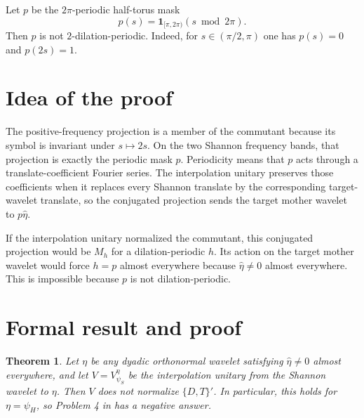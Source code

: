 \documentclass[11pt]{article}
\newtheorem{theorem}{Theorem}
\begin{document}
Let $p$ be the $2\pi$-periodic half-torus mask
\begin{equation}\label{eq:p}
 p(s)=\mathbf1_{[\pi,2\pi)}(s\bmod 2\pi).
\end{equation}
Then $p$ is not $2$-dilation-periodic.  Indeed, for
$s\in(\pi/2,\pi)$ one has $p(s)=0$ and $p(2s)=1$.

\section{Idea of the proof}

The positive-frequency projection is a member of the commutant because its
symbol is invariant under $s\mapsto2s$.  On the two Shannon frequency bands,
that projection is exactly the periodic mask $p$.  Periodicity means that $p$
acts through a translate-coefficient Fourier series.  The interpolation unitary
preserves those coefficients when it replaces every Shannon translate by the
corresponding target-wavelet translate, so the conjugated projection sends the
target mother wavelet to $p\widehat\eta$.

If the interpolation unitary normalized the commutant, this conjugated
projection would be $M_h$ for a dilation-periodic $h$.  Its action on the target
mother wavelet would force $h=p$ almost everywhere because
$\widehat\eta\ne0$ almost everywhere.  This is impossible because $p$ is not
dilation-periodic.

\section{Formal result and proof}

\begin{theorem}\label{thm:main}
Let $\eta$ be any dyadic orthonormal wavelet satisfying
$\widehat\eta\ne0$ almost everywhere, and let $V=V_{\psi_S}^{\eta}$ be the
interpolation unitary from the Shannon wavelet to $\eta$.  Then $V$ does not
normalize $\{D,T\}'$.  In particular, this holds for $\eta=\psi_H$, so Problem
4 in \cite{Larson2006} has a negative answer.
\end{theorem}
\end{document}
